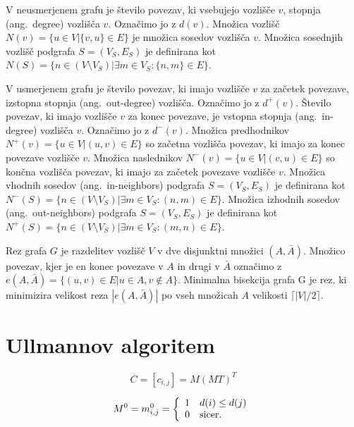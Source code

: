 \documentclass[a4paper, 12pt, ]{book}
\begin{document}
	V neusmerjenem grafu je število povezav, ki vsebujejo vozlišče $v$, stopnja (ang.~degree) vozlišča $v$. Označimo jo z $d(v)$. Množica vozlišč
	$N(v) = \{u \in V \big| \{v, u\} \in E\}$ je množica sosedov vozlišča $v$. 
	Množica sosednjih vozlišč podgrafa $S = (V_S, E_S)$ je definirana kot 
	$N(S) = \{ n \in (V \setminus V_S) \big| \exists m \in V_S : \{n,m\} \in E \}$. 

	V usmerjenem grafu je število povezav, ki imajo vozlišče $v$ za začetek
	povezave, 	izstopna stopnja (ang.~out-degree) vozlišča. Označimo jo z $d^+(v)$.
	Število povezav, ki imajo vozlišče $v$ za konec povezave, je vstopna stopnja (ang.~in-degree) vozlišča $v$. Označimo jo z $d^-(v)$.
	Množica predhodnikov 
	$N^+(v) = \{u \in V \big| (u,v) \in E\}$
	so začetna vozlišča povezav, ki imajo za konec povezave vozlišče $v$. Množica naslednikov
	$N^-(v) = \{u \in V \big| (v,u) \in E\}$
	so končna vozlišča povezav, ki imajo za začetek povezave vozlišče $v$.
	Množica vhodnih sosedov (ang.~in-neighbors) podgrafa $S = (V_S, E_S)$ je definirana kot 
	$N^-(S) = \{ n \in (V \setminus V_S) \big| \exists m \in V_S : (n,m) \in E \}$.
	Množica izhodnih sosedov (ang.~out-neighbors) podgrafa $S = (V_S, E_S)$ je definirana kot 
	$N^+(S) = \{ n \in (V \setminus V_S) \big| \exists m \in V_S : (m,n) \in E \}$.

	Rez grafa $G$ je razdelitev vozlišč $V$ v dve disjunktni množici $(A, \bar A)$. Množico povezav, kjer je en konec povezave v $A$ in drugi v
	 $\bar A$ označimo z $e(A, \bar A) = \{(u,v) \in E \big| u \in A, v \not \in A\}$. Minimalna bisekcija  grafa G je rez, ki minimizira velikost reza 
	$| e(A, \bar A) |$ po vseh množicah $A$ velikosti $\lceil | V | / 2 \rceil$.

		

\chapter{Ullmannov algoritem}


\begin{equation}
\label{eq:ullmann1}
C = [c_{i,j}] = M(MT)^T
\end{equation}

\begin{equation}
\label{eq:ullmann2}
M^0 = m_{i,j}^0 = \left\{ 
  \begin{array}{l l}
    1 & \text{$d(i) \leq d(j)$}\\
    0 & \text{sicer.}
  \end{array} \right.
\end{equation}
\end{document}
